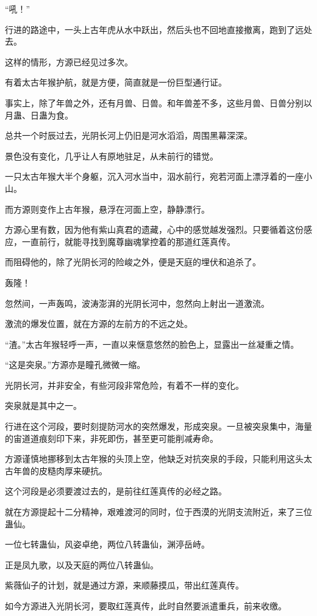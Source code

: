 \begin{this_body}
“吼！”

行进的路途中，一头上古年虎从水中跃出，然后头也不回地直接撤离，跑到了远处去。

这样的情形，方源已经见过多次。

有着太古年猴护航，就是方便，简直就是一份巨型通行证。

事实上，除了年兽之外，还有月兽、日兽。和年兽差不多，这些月兽、日兽分别以月蛊、日蛊为食。

总共一个时辰过去，光阴长河上仍旧是河水滔滔，周围黑幕深深。

景色没有变化，几乎让人有原地驻足，从未前行的错觉。

一只太古年猴大半个身躯，沉入河水当中，泅水前行，宛若河面上漂浮着的一座小山。

而方源则变作上古年猴，悬浮在河面上空，静静漂行。

方源心里有数，因为他有紫山真君的遗藏，心中的感觉越发强烈。只要循着这份感应，一直前行，就能寻找到魔尊幽魂掌控着的那道红莲真传。

而阻碍他的，除了光阴长河的险峻之外，便是天庭的埋伏和追杀了。

轰隆！

忽然间，一声轰鸣，波涛澎湃的光阴长河中，忽然向上射出一道激流。

激流的爆发位置，就在方源的左前方的不远之处。

“渣。”太古年猴轻呼一声，一直以来惬意悠然的脸色上，显露出一丝凝重之情。

“这是突泉。”方源亦是瞳孔微微一缩。

光阴长河，并非安全，有些河段非常危险，有着不一样的变化。

突泉就是其中之一。

行进在这个河段，要时刻提防河水的突然爆发，形成突泉。一旦被突泉集中，海量的宙道道痕刻印下来，非死即伤，甚至更可能削减寿命。

方源谨慎地挪移到太古年猴的头顶上空，他缺乏对抗突泉的手段，只能利用这头太古年兽的皮糙肉厚来硬抗。

这个河段是必须要渡过去的，是前往红莲真传的必经之路。

就在方源提起十二分精神，艰难渡河的同时，位于西漠的光阴支流附近，来了三位蛊仙。

一位七转蛊仙，风姿卓绝，两位八转蛊仙，渊渟岳峙。

正是凤九歌，以及天庭的两位八转蛊仙。

紫薇仙子的计划，就是通过方源，来顺藤摸瓜，带出红莲真传。

如今方源进入光阴长河，要取红莲真传，此时自然要派遣重兵，前来收缴。


\end{this_body}
